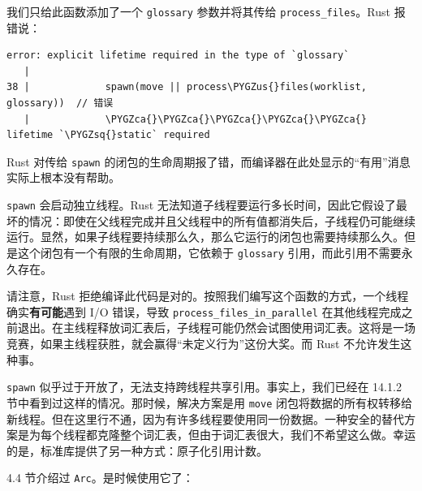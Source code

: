 我们只给此函数添加了一个 \texttt{glossary} 参数并将其传给 \texttt{process\_files}。Rust 报错说：

\begin{Verbatim}[commandchars=\\\{\},breaklines=true,breakanywhere=true,fontsize=\codefont,xleftmargin=17bp]
error: explicit lifetime required in the type of `glossary`
   |
38 |             spawn(move || process\PYGZus{}files(worklist, glossary))  // 错误
   |             \PYGZca{}\PYGZca{}\PYGZca{}\PYGZca{}\PYGZca{} lifetime `\PYGZsq{}static` required
\end{Verbatim}

Rust 对传给 \texttt{spawn} 的闭包的生命周期报了错，而编译器在此处显示的“有用”消息实际上根本没有帮助。

\texttt{spawn} 会启动独立线程。Rust 无法知道子线程要运行多长时间，因此它假设了最坏的情况：即使在父线程完成并且父线程中的所有值都消失后，子线程仍可能继续运行。显然，如果子线程要持续那么久，那么它运行的闭包也需要持续那么久。但是这个闭包有一个有限的生命周期，它依赖于 \texttt{glossary} 引用，而此引用不需要永久存在。

请注意，Rust 拒绝编译此代码是对的。按照我们编写这个函数的方式，一个线程确实\textbf{有可能}遇到 I/O 错误，导致 \texttt{process\_files\_in\_parallel} 在其他线程完成之前退出。在主线程释放词汇表后，子线程可能仍然会试图使用词汇表。这将是一场竞赛，如果主线程获胜，就会赢得“未定义行为”这份大奖。而 Rust 不允许发生这种事。

\texttt{spawn} 似乎过于开放了，无法支持跨线程共享引用。事实上，我们已经在 14.1.2 节中看到过这样的情况。那时候，解决方案是用 \texttt{move} 闭包将数据的所有权转移给新线程。但在这里行不通，因为有许多线程要使用同一份数据。一种安全的替代方案是为每个线程都克隆整个词汇表，但由于词汇表很大，我们不希望这么做。幸运的是，标准库提供了另一种方式：原子化引用计数。

4.4 节介绍过 \texttt{Arc}。是时候使用它了：

